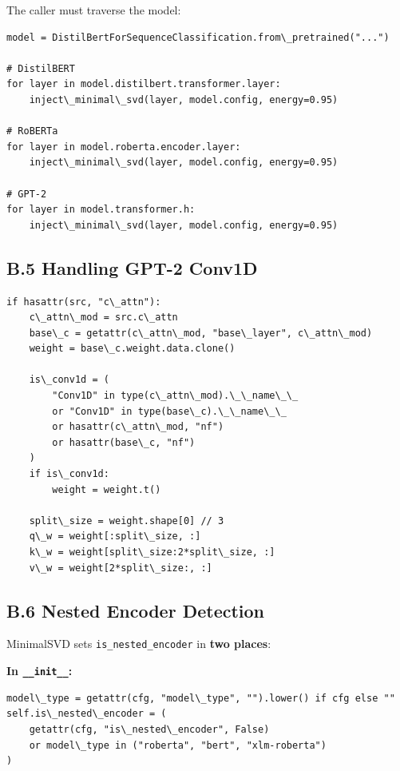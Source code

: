 The caller must traverse the model:

\begin{lstlisting}
model = DistilBertForSequenceClassification.from\_pretrained("...")

# DistilBERT
for layer in model.distilbert.transformer.layer:
    inject\_minimal\_svd(layer, model.config, energy=0.95)

# RoBERTa
for layer in model.roberta.encoder.layer:
    inject\_minimal\_svd(layer, model.config, energy=0.95)

# GPT-2
for layer in model.transformer.h:
    inject\_minimal\_svd(layer, model.config, energy=0.95)
\end{lstlisting}

\subsection{B.5 Handling GPT-2 Conv1D}

\begin{lstlisting}
if hasattr(src, "c\_attn"):
    c\_attn\_mod = src.c\_attn
    base\_c = getattr(c\_attn\_mod, "base\_layer", c\_attn\_mod)
    weight = base\_c.weight.data.clone()
    
    is\_conv1d = (
        "Conv1D" in type(c\_attn\_mod).\_\_name\_\_
        or "Conv1D" in type(base\_c).\_\_name\_\_
        or hasattr(c\_attn\_mod, "nf")
        or hasattr(base\_c, "nf")
    )
    if is\_conv1d:
        weight = weight.t()
    
    split\_size = weight.shape[0] // 3
    q\_w = weight[:split\_size, :]
    k\_w = weight[split\_size:2*split\_size, :]
    v\_w = weight[2*split\_size:, :]
\end{lstlisting}

\subsection{B.6 Nested Encoder Detection}

MinimalSVD sets \texttt{is\_nested\_encoder} in \textbf{two places}:

\textbf{In \texttt{\_\_init\_\_}:}

\begin{lstlisting}
model\_type = getattr(cfg, "model\_type", "").lower() if cfg else ""
self.is\_nested\_encoder = (
    getattr(cfg, "is\_nested\_encoder", False)
    or model\_type in ("roberta", "bert", "xlm-roberta")
)
\end{lstlisting}

